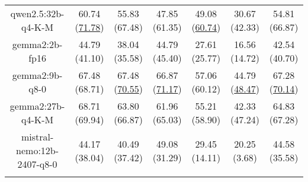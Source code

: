 \begin{table}[hbp]
{\begin{tabular}{ccccccc}
      \multicolumn{1}{c|}{qwen2.5:32b-q4-K-M} & 60.74 (\underline{71.78}) & 55.83 (67.48) & \multicolumn{1}{c|}{47.85 (61.35)} & 49.08 (\underline{60.74}) & \multicolumn{1}{c|}{30.67 (42.33)} & 54.81 (66.87) \\


      \multicolumn{1}{c|}{gemma2:2b-fp16} & 44.79 (41.10) & 38.04 (35.58) & \multicolumn{1}{c|}{44.79 (45.40)} & 27.61 (25.77) & \multicolumn{1}{c|}{16.56 (14.72)} & 42.54 (40.70) \\


      \multicolumn{1}{c|}{gemma2:9b-q8-0} & 67.48 (68.71) & 67.48 (\underline{70.55}) & \multicolumn{1}{c|}{66.87 (\underline{71.17})} & 57.06 (60.12) & \multicolumn{1}{c|}{44.79 (\underline{48.47})} & 67.28 (\underline{70.14}) \\


      \multicolumn{1}{c|}{gemma2:27b-q4-K-M} & 68.71 (69.94) & 63.80 (66.87) & \multicolumn{1}{c|}{61.96 (65.03)} & 55.21 (58.90) & \multicolumn{1}{c|}{42.33 (47.24)} & 64.83 (67.28) \\


      \multicolumn{1}{c|}{mistral-nemo:12b-2407-q8-0} & 44.17 (38.04) & 40.49 (37.42) & \multicolumn{1}{c|}{49.08 (31.29)} & 29.45 (14.11) & \multicolumn{1}{c|}{20.25 (3.68)} & 44.58 (35.58) \\

      \\ \hline
    \end{tabular}%
  }
\end{table}